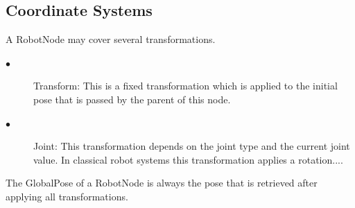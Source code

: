 \subsection{Coordinate Systems}
\par
A RobotNode may cover several transformations.
\par
\begin{description}
  \item[$\bullet$]Transform: This is a fixed transformation which is applied to the initial pose that is passed by the parent of this node.
    \item[$\bullet$] Joint: This transformation depends on the joint type and the current joint value. In classical robot systems this transformation applies a rotation....
\end{description}
   \par
   The GlobalPose of a RobotNode is always the pose that is retrieved after applying all transformations. 
   \par
